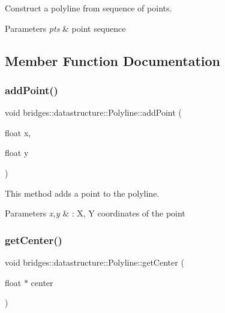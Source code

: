 Construct a polyline from sequence of points. 


\begin{DoxyParams}{Parameters}
{\em pts} & point sequence \\
\hline
\end{DoxyParams}


\subsection{Member Function Documentation}
\mbox{\label{classbridges_1_1datastructure_1_1_polyline_a00698223911f07cafca29ec80c507678}} 
\subsubsection{\texorpdfstring{add\+Point()}{addPoint()}}
{\footnotesize\ttfamily void bridges\+::datastructure\+::\+Polyline\+::add\+Point (\begin{DoxyParamCaption}\item[{float}]{x,  }\item[{float}]{y }\end{DoxyParamCaption})\hspace{0.3cm}{\ttfamily [inline]}}



This method adds a point to the polyline. 


\begin{DoxyParams}{Parameters}
{\em x,y} & \+: X, Y coordinates of the point \\
\hline
\end{DoxyParams}
\mbox{\label{classbridges_1_1datastructure_1_1_polyline_ad0783deb77873eda19528681bbbca25c}} 
\subsubsection{\texorpdfstring{get\+Center()}{getCenter()}}
{\footnotesize\ttfamily void bridges\+::datastructure\+::\+Polyline\+::get\+Center (\begin{DoxyParamCaption}\item[{float $\ast$}]{center }\end{DoxyParamCaption})\hspace{0.3cm}{\ttfamily [inline]}}



